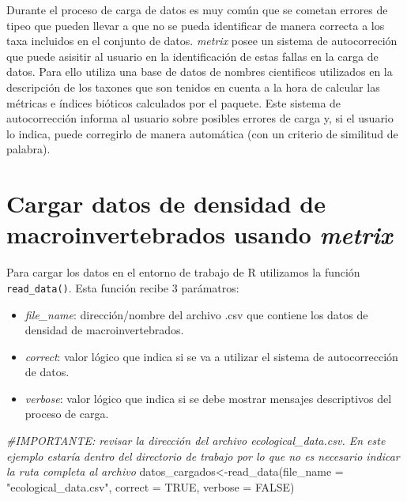 \documentclass[
]{book}
\newenvironment{Shaded}{\begin{snugshade}}{\end{snugshade}}
\newcommand{\AttributeTok}[1]{\textcolor[rgb]{0.77,0.63,0.00}{#1}}
\newcommand{\CommentTok}[1]{\textcolor[rgb]{0.56,0.35,0.01}{\textit{#1}}}
\newcommand{\ConstantTok}[1]{\textcolor[rgb]{0.00,0.00,0.00}{#1}}
\newcommand{\FunctionTok}[1]{\textcolor[rgb]{0.00,0.00,0.00}{#1}}
\newcommand{\NormalTok}[1]{#1}
\newcommand{\OtherTok}[1]{\textcolor[rgb]{0.56,0.35,0.01}{#1}}
\newcommand{\StringTok}[1]{\textcolor[rgb]{0.31,0.60,0.02}{#1}}
\begin{document}
Durante el proceso de carga de datos es muy común que se cometan errores de tipeo que pueden llevar a que no se pueda identificar de manera correcta a los taxa incluidos en el conjunto de datos.
\emph{metrix} posee un sistema de autocorreción que puede asisitir al usuario en la identificación de estas fallas en la carga de datos.
Para ello utiliza una base de datos de nombres cientificos utilizados en la descripción de los taxones que son tenidos en cuenta a la hora de calcular las métricas e índices bióticos calculados por el paquete.
Este sistema de autocorrección informa al usuario sobre posibles errores de carga y, si el usuario lo indica, puede corregirlo de manera automática (con un criterio de similitud de palabra).

\hypertarget{cargar-datos-de-densidad-de-macroinvertebrados-usando-metrix}{%
\section{\texorpdfstring{Cargar datos de densidad de macroinvertebrados usando \emph{metrix}}{Cargar datos de densidad de macroinvertebrados usando metrix}}\label{cargar-datos-de-densidad-de-macroinvertebrados-usando-metrix}}

Para cargar los datos en el entorno de trabajo de R utilizamos la función \texttt{read\_data()}.
Esta función recibe 3 parámatros:

\begin{itemize}
\item
  \emph{file\_name}: dirección/nombre del archivo .csv que contiene los datos de densidad de macroinvertebrados.
\item
  \emph{correct}: valor lógico que indica si se va a utilizar el sistema de autocorrección de datos.
\item
  \emph{verbose}: valor lógico que indica si se debe mostrar mensajes descriptivos del proceso de carga.
\end{itemize}

\begin{Shaded}
\begin{Highlighting}[]
\CommentTok{\#IMPORTANTE: revisar la dirección del archivo ecological\_data.csv. En este ejemplo estaría dentro del directorio de trabajo por lo que no es necesario indicar la ruta completa al archivo}
\NormalTok{datos\_cargados}\OtherTok{\textless{}{-}}\FunctionTok{read\_data}\NormalTok{(}\AttributeTok{file\_name =} \StringTok{"ecological\_data.csv"}\NormalTok{, }\AttributeTok{correct =} \ConstantTok{TRUE}\NormalTok{, }\AttributeTok{verbose =} \ConstantTok{FALSE}\NormalTok{)}
\end{Highlighting}
\end{Shaded}
\end{document}
